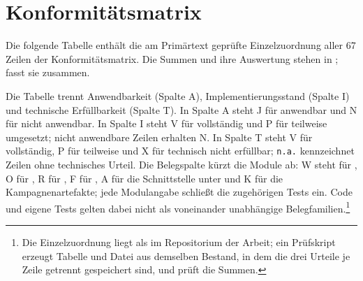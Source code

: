 
\chapter{Konformitätsmatrix}
\label{chap:anhang-konformitaet}

Die folgende Tabelle enthält die am Primärtext geprüfte Einzelzuordnung aller 67 Zeilen der
Konformitätsmatrix. Die Summen und ihre Auswertung stehen in ;
 fasst sie zusammen.

Die Tabelle trennt Anwendbarkeit (Spalte A), Implementierungsstand (Spalte I) und technische
Erfüllbarkeit (Spalte T). In Spalte A steht J für anwendbar und N für nicht anwendbar. In Spalte I
steht V für vollständig und P für teilweise umgesetzt; nicht anwendbare Zeilen erhalten N. In Spalte T
steht V für vollständig, P für teilweise und X für technisch nicht erfüllbar; \texttt{n.a.}
kennzeichnet Zeilen ohne technisches Urteil. Die Belegspalte kürzt die Module ab: W steht für
, O für , R für , F für , A für die
Schnittstelle unter  und K für die Kampagnenartefakte; jede Modulangabe schließt die
zugehörigen Tests ein. Code und eigene Tests gelten dabei nicht als voneinander unabhängige
Belegfamilien.\footnote{Die Einzelzuordnung liegt als 
im Repositorium der Arbeit; ein Prüfskript erzeugt Tabelle und Datei aus demselben Bestand, in dem
die drei Urteile je Zeile getrennt gespeichert sind, und prüft die Summen.}


